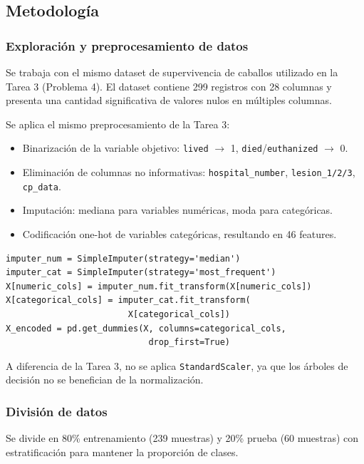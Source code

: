 \documentclass{article}
\begin{document}
\subsection{Metodología}

\subsubsection{Exploración y preprocesamiento de datos}

Se trabaja con el mismo dataset de supervivencia de caballos utilizado en la Tarea 3 (Problema 4). El dataset contiene 299 registros con 28 columnas y presenta una cantidad significativa de valores nulos en múltiples columnas.

Se aplica el mismo preprocesamiento de la Tarea 3:
\begin{itemize}
    \item Binarización de la variable objetivo: \texttt{lived} $\rightarrow$ 1, \texttt{died}/\texttt{euthanized} $\rightarrow$ 0.
    \item Eliminación de columnas no informativas: \texttt{hospital\_number}, \texttt{lesion\_1/2/3}, \texttt{cp\_data}.
    \item Imputación: mediana para variables numéricas, moda para categóricas.
    \item Codificación one-hot de variables categóricas, resultando en 46 features.
\end{itemize}

\begin{lstlisting}
imputer_num = SimpleImputer(strategy='median')
imputer_cat = SimpleImputer(strategy='most_frequent')
X[numeric_cols] = imputer_num.fit_transform(X[numeric_cols])
X[categorical_cols] = imputer_cat.fit_transform(
                        X[categorical_cols])
X_encoded = pd.get_dummies(X, columns=categorical_cols, 
                            drop_first=True)
\end{lstlisting}

A diferencia de la Tarea 3, no se aplica \texttt{StandardScaler}, ya que los árboles de decisión no se benefician de la normalización.

\subsubsection{División de datos}

Se divide en 80\% entrenamiento (239 muestras) y 20\% prueba (60 muestras) con estratificación para mantener la proporción de clases.
\end{document}
